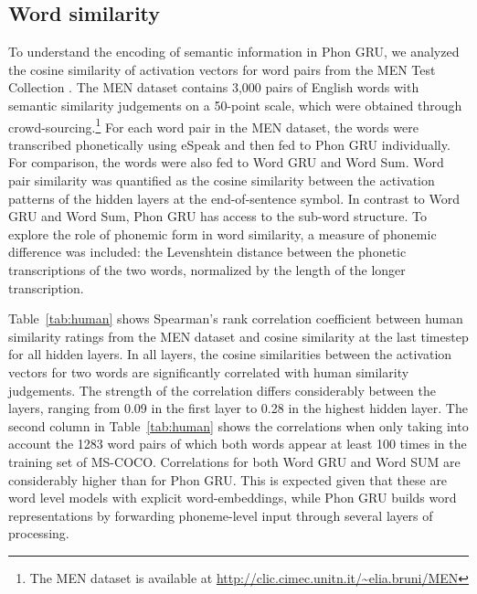 \subsection{Word similarity}
To understand the encoding of semantic information in {\sc Phon GRU}, we analyzed the cosine similarity of activation vectors for word pairs from the MEN Test Collection \cite{bruni2014multimodal}. The MEN dataset contains 3,000 pairs of English words with semantic similarity judgements on a 50-point scale, which were obtained through crowd-sourcing.\footnote{The MEN dataset is available at \url{http://clic.cimec.unitn.it/~elia.bruni/MEN}}
For each word pair in the MEN dataset, the words were transcribed phonetically using eSpeak and then fed to {\sc Phon GRU} individually. For comparison, the words were also fed to {\sc Word GRU} and {\sc Word Sum}. Word pair similarity was quantified as the cosine similarity between the activation patterns of the hidden layers at the end-of-sentence symbol.
In contrast to {\sc Word GRU} and {\sc Word Sum}, {\sc Phon GRU} has access to the sub-word structure. To explore the role of phonemic form in word similarity, a measure of phonemic difference was included: the Levenshtein distance between the phonetic transcriptions of the two words, normalized by the length of the longer transcription. 

Table~\ref{tab:human} shows Spearman's rank correlation coefficient between human similarity ratings from the MEN dataset and cosine similarity at the last timestep for all hidden layers. In all layers, the cosine similarities between the activation vectors for two words are significantly correlated with human similarity judgements. The strength of the correlation differs considerably between the layers, ranging from 0.09 in the first layer to 0.28 in the highest hidden layer. The second column in Table~\ref{tab:human} shows the correlations when only taking into account the 1283 word pairs of which both words appear at least 100 times in the training set of MS-COCO. 
Correlations for both {\sc Word GRU} and {\sc Word SUM} are considerably higher than for {\sc Phon GRU}. This is expected given that these are word level models with explicit word-embeddings, while {\sc Phon GRU} builds word representations by forwarding phoneme-level input through several layers of processing.

